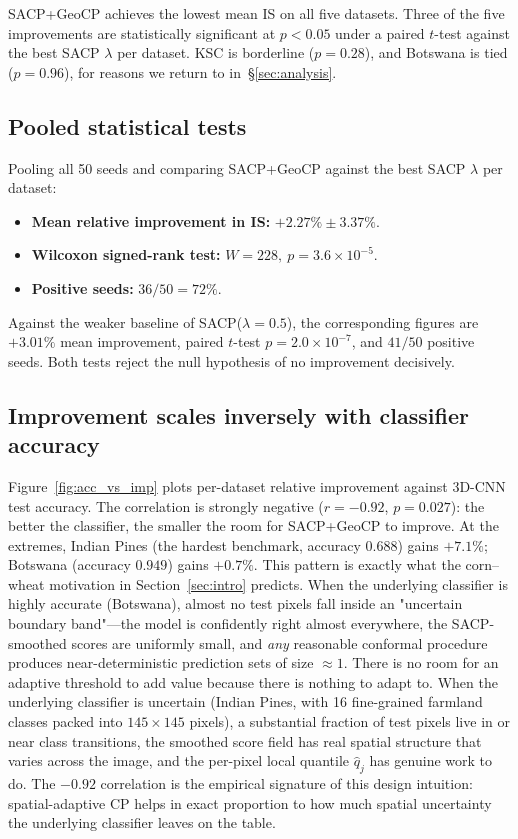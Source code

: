 \documentclass[11pt]{article}
\newcommand{\1}{\mathbf{1}}
\begin{document}
SACP+GeoCP achieves the lowest mean IS on all five datasets.  Three of the five improvements are statistically significant at $p<0.05$ under a paired $t$-test against the best SACP $\lambda$ per dataset.  KSC is borderline ($p=0.28$), and Botswana is tied ($p=0.96$), for reasons we return to in~\S\ref{sec:analysis}.

\subsection{Pooled statistical tests}

Pooling all 50 seeds and comparing SACP+GeoCP against the best SACP $\lambda$ per dataset:
\begin{itemize}
    \item \textbf{Mean relative improvement in IS:} $+2.27\% \pm 3.37\%$.
    \item \textbf{Wilcoxon signed-rank test:} $W = 228,\ p = 3.6 \times 10^{-5}$.
    \item \textbf{Positive seeds:} $36/50 = 72\%$.
\end{itemize}
Against the weaker baseline of SACP($\lambda{=}0.5$), the corresponding figures are $+3.01\%$ mean improvement, paired $t$-test $p = 2.0 \times 10^{-7}$, and $41/50$ positive seeds. Both tests reject the null hypothesis of no improvement decisively.

\subsection{Improvement scales inversely with classifier accuracy}

Figure~\ref{fig:acc_vs_imp} plots per-dataset relative improvement against 3D-CNN test accuracy. The correlation is strongly negative ($r = -0.92$, $p = 0.027$): the better the classifier, the smaller the room for SACP+GeoCP to improve. At the extremes, Indian Pines (the hardest benchmark, accuracy $0.688$) gains $+7.1\%$; Botswana (accuracy $0.949$) gains $+0.7\%$. This pattern is exactly what the corn--wheat motivation in Section~\ref{sec:intro} predicts. When the underlying classifier is highly accurate (Botswana), almost no test pixels fall inside an "uncertain boundary band"---the model is confidently right almost everywhere, the SACP-smoothed scores are uniformly small, and \emph{any} reasonable conformal procedure produces near-deterministic prediction sets of size $\approx 1$. There is no room for an adaptive threshold to add value because there is nothing to adapt to. When the underlying classifier is uncertain (Indian Pines, with 16 fine-grained farmland classes packed into $145 \times 145$ pixels), a substantial fraction of test pixels live in or near class transitions, the smoothed score field has real spatial structure that varies across the image, and the per-pixel local quantile $\hat q_j$ has genuine work to do. The $-0.92$ correlation is the empirical signature of this design intuition: spatial-adaptive CP helps in exact proportion to how much spatial uncertainty the underlying classifier leaves on the table.
\end{document}

